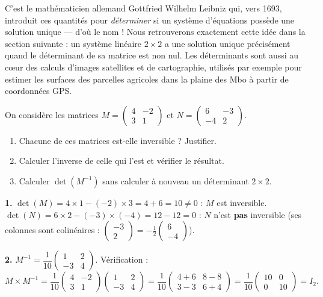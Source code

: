 \documentclass[11pt]{article}
\begin{document}
\begin{savaistu}
C'est le mathématicien allemand Gottfried Wilhelm Leibniz qui, vers 1693, introduit ces quantités pour \emph{déterminer} si un système d'équations possède une solution unique — d'où le nom ! Nous retrouverons exactement cette idée dans la section suivante : un système linéaire $2\times 2$ a une solution unique précisément quand le déterminant de sa matrice est non nul. Les déterminants sont aussi au cœur des calculs d'images satellites et de cartographie, utilisés par exemple pour estimer les surfaces des parcelles agricoles dans la plaine des Mbo à partir de coordonnées GPS.
\end{savaistu}

\begin{exoresolu}
On considère les matrices $M = \begin{pmatrix} 4 & -2 \\ 3 & 1 \end{pmatrix}$ et $N = \begin{pmatrix} 6 & -3 \\ -4 & 2 \end{pmatrix}$.
\begin{enumerate}
\item Chacune de ces matrices est-elle inversible ? Justifier.
\item Calculer l'inverse de celle qui l'est et vérifier le résultat.
\item Calculer $\det(M^{-1})$ sans calculer à nouveau un déterminant $2\times 2$.
\end{enumerate}
\tcblower
\textbf{1.} $\det(M) = 4\times 1 - (-2)\times 3 = 4 + 6 = 10 \neq 0$ : $M$ est inversible. $\det(N) = 6\times 2 - (-3)\times(-4) = 12 - 12 = 0$ : $N$ n'est \textbf{pas} inversible (ses colonnes sont colinéaires : $\begin{pmatrix} -3 \\ 2 \end{pmatrix} = -\frac{1}{2}\begin{pmatrix} 6 \\ -4 \end{pmatrix}$).

\textbf{2.} $M^{-1} = \dfrac{1}{10}\begin{pmatrix} 1 & 2 \\ -3 & 4 \end{pmatrix}$. Vérification :
\[ M \times M^{-1} = \frac{1}{10}\begin{pmatrix} 4 & -2 \\ 3 & 1 \end{pmatrix}\begin{pmatrix} 1 & 2 \\ -3 & 4 \end{pmatrix} = \frac{1}{10}\begin{pmatrix} 4+6 & 8-8 \\ 3-3 & 6+4 \end{pmatrix} = \frac{1}{10}\begin{pmatrix} 10 & 0 \\ 0 & 10 \end{pmatrix} = I_2. \]


\end{exoresolu}
\end{document}

